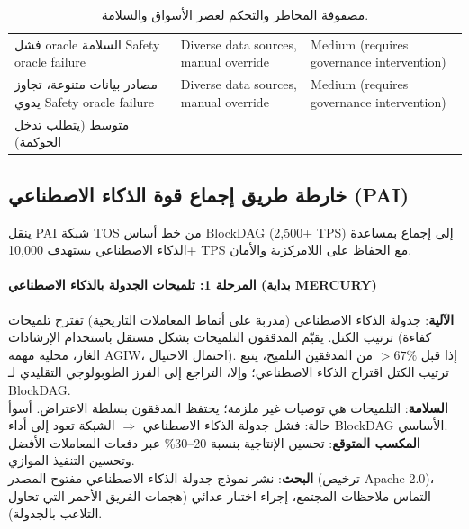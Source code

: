 \documentclass[11pt]{article}
\begin{document}
\begin{table}[H]
\begin{tabular}{p{}p{}p{}}
    فشل oracle السلامة     Safety oracle failure & Diverse data sources, manual override & Medium (requires governance intervention) \\ مصادر بيانات متنوعة، تجاوز يدوي     Safety oracle failure & Diverse data sources, manual override & Medium (requires governance intervention) \\ متوسط (يتطلب تدخل الحوكمة) \\
    \bottomrule
  \end{tabular}
  \caption{مصفوفة المخاطر والتحكم لعصر الأسواق والسلامة.}
  \label{tab:risk-markets}
\end{table}

\subsection{خارطة طريق إجماع قوة الذكاء الاصطناعي (PAI)}
\label{sec:pai-roadmap}
ينقل PAI شبكة TOS من خط أساس BlockDAG (2,500+ TPS) إلى إجماع بمساعدة الذكاء الاصطناعي يستهدف 10,000+ TPS مع الحفاظ على اللامركزية والأمان.

\paragraph{المرحلة 1: تلميحات الجدولة بالذكاء الاصطناعي (بداية MERCURY)}
\textbf{الآلية}: جدولة الذكاء الاصطناعي (مدربة على أنماط المعاملات التاريخية) تقترح تلميحات ترتيب الكتل. يقيّم المدققون التلميحات بشكل مستقل باستخدام الإرشادات (كفاءة الغاز، محلية مهمة AGIW، احتمال الاحتيال). إذا قبل $>67\%$ من المدققين التلميح، يتبع ترتيب الكتل اقتراح الذكاء الاصطناعي؛ وإلا، التراجع إلى الفرز الطوبولوجي التقليدي لـ BlockDAG.\\
\textbf{السلامة}: التلميحات هي توصيات غير ملزمة؛ يحتفظ المدققون بسلطة الاعتراض. أسوأ حالة: فشل جدولة الذكاء الاصطناعي $\Rightarrow$ الشبكة تعود إلى أداء BlockDAG الأساسي.\\
\textbf{المكسب المتوقع}: تحسين الإنتاجية بنسبة 20--30\% عبر دفعات المعاملات الأفضل وتحسين التنفيذ الموازي.\\
\textbf{البحث}: نشر نموذج جدولة الذكاء الاصطناعي مفتوح المصدر (ترخيص Apache 2.0)، التماس ملاحظات المجتمع، إجراء اختبار عدائي (هجمات الفريق الأحمر التي تحاول التلاعب بالجدولة).
\end{document}
